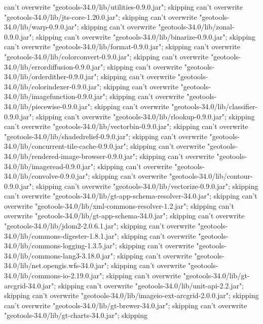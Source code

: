     can't overwrite "geotools-34.0/lib/utilities-0.9.0.jar"; skipping
    can't overwrite "geotools-34.0/lib/jts-core-1.20.0.jar"; skipping
    can't overwrite "geotools-34.0/lib/warp-0.9.0.jar"; skipping
    can't overwrite "geotools-34.0/lib/zonal-0.9.0.jar"; skipping
    can't overwrite "geotools-34.0/lib/binarize-0.9.0.jar"; skipping
    can't overwrite "geotools-34.0/lib/format-0.9.0.jar"; skipping
    can't overwrite "geotools-34.0/lib/colorconvert-0.9.0.jar"; skipping
    can't overwrite "geotools-34.0/lib/errordiffusion-0.9.0.jar"; skipping
    can't overwrite "geotools-34.0/lib/orderdither-0.9.0.jar"; skipping
    can't overwrite "geotools-34.0/lib/colorindexer-0.9.0.jar"; skipping
    can't overwrite "geotools-34.0/lib/imagefunction-0.9.0.jar"; skipping
    can't overwrite "geotools-34.0/lib/piecewise-0.9.0.jar"; skipping
    can't overwrite "geotools-34.0/lib/classifier-0.9.0.jar"; skipping
    can't overwrite "geotools-34.0/lib/rlookup-0.9.0.jar"; skipping
    can't overwrite "geotools-34.0/lib/vectorbin-0.9.0.jar"; skipping
    can't overwrite "geotools-34.0/lib/shadedrelief-0.9.0.jar"; skipping
    can't overwrite "geotools-34.0/lib/concurrent-tile-cache-0.9.0.jar"; skipping
    can't overwrite "geotools-34.0/lib/rendered-image-browser-0.9.0.jar"; skipping
    can't overwrite "geotools-34.0/lib/imageread-0.9.0.jar"; skipping
    can't overwrite "geotools-34.0/lib/convolve-0.9.0.jar"; skipping
    can't overwrite "geotools-34.0/lib/contour-0.9.0.jar"; skipping
    can't overwrite "geotools-34.0/lib/vectorize-0.9.0.jar"; skipping
    can't overwrite "geotools-34.0/lib/gt-app-schema-resolver-34.0.jar"; skipping
    can't overwrite "geotools-34.0/lib/xml-commons-resolver-1.2.jar"; skipping
    can't overwrite "geotools-34.0/lib/gt-app-schema-34.0.jar"; skipping
    can't overwrite "geotools-34.0/lib/jdom2-2.0.6.1.jar"; skipping
    can't overwrite "geotools-34.0/lib/commons-digester-1.8.1.jar"; skipping
    can't overwrite "geotools-34.0/lib/commons-logging-1.3.5.jar"; skipping
    can't overwrite "geotools-34.0/lib/commons-lang3-3.18.0.jar"; skipping
    can't overwrite "geotools-34.0/lib/net.opengis.wfs-34.0.jar"; skipping
    can't overwrite "geotools-34.0/lib/commons-io-2.19.0.jar"; skipping
    can't overwrite "geotools-34.0/lib/gt-arcgrid-34.0.jar"; skipping
    can't overwrite "geotools-34.0/lib/unit-api-2.2.jar"; skipping
    can't overwrite "geotools-34.0/lib/imageio-ext-arcgrid-2.0.0.jar"; skipping
    can't overwrite "geotools-34.0/lib/gt-brewer-34.0.jar"; skipping
    can't overwrite "geotools-34.0/lib/gt-charts-34.0.jar"; skipping

